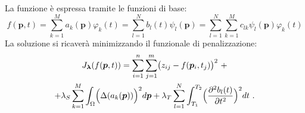 \documentclass[landscape,9pt]{beamer}                           %
\begin{document}
\begin{frame}
La funzione è espressa tramite le funzioni di base:
$$
f(\bm{p}, t) = \sum_{k=1}^M a_k(\bm{p})\varphi_k(t) = \sum_{l=1}^N b_l(t)\psi_l(\bm{p}) = \sum_{l=1}^N \sum_{k=1}^M c_{lk}\psi_l(\bm{p})\varphi_k(t)
$$
La soluzione si ricaverà minimizzando il funzionale di penalizzazione:
\begin{multline*}
J_{\bm \lambda }(f(\bm p,t))=\sum_{i=1}^n \sum_{j=1}^m \bigl( z_{ij} - f(\bm p_i,t_j) \bigr)^2 \ + \\
+\lambda_S  \sum_{k=1}^M \int_{\Omega} \Bigl( \Delta(  a_k(\bm p)  ) \Bigr)^2 d \bm p + \lambda_T \sum_{l=1}^N\int_{T_1}^{T_2} \Bigl( \frac{\partial^2   b_l(t)   }{\partial t ^2} \Bigr)^2 dt \ .
\end{multline*}
\end{frame}
\end{document}
